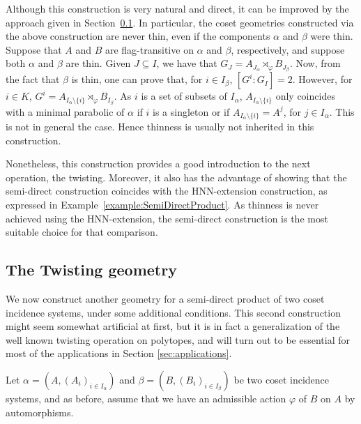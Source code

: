 \documentclass[11pt,letterpaper]{amsart}
\begin{document}
Although this construction is very natural and direct, it can be improved by the approach given in Section~\ref{subsec:twist_section}.
In particular, the coset geometries constructed via the above construction are never thin, even if the components $\alpha$ and $\beta$ were thin.
Suppose that $A$ and $B$ are flag-transitive on $\alpha$ and $\beta$, respectively, and suppose both $\alpha$ and $\beta$ are thin.
Given $J\subseteq I$, we have that $G_{J}=A_{J_\alpha}\rtimes_\varphi B_{J_\beta}$. 
Now, from the fact that $\beta$ is thin, one can prove that, for $i\in I_\beta$, $[G^i:G_I]=2$.
However, for $i\in K$, $G^{i} = A_{I_\alpha\setminus\{i\}}\rtimes_\varphi B_{I_\beta}$.
As $i$ is a set of subsets of $I_\alpha$, $A_{I_\alpha\setminus\{i\}}$ only coincides with a minimal parabolic of $\alpha$ if $i$ is a singleton or if $A_{I_\alpha\setminus\{i\}} = A^j$, for $j\in I_\alpha$. This is not in general the case.
Hence thinness is usually not inherited in this construction.

Nonetheless, this construction provides a good introduction to the next operation, the twisting. Moreover, it also has the advantage of showing that the semi-direct construction coincides with the HNN-extension construction, as expressed in Example~\ref{example:SemiDirectProduct}. As thinness is never achieved using the HNN-extension, the semi-direct construction is the most suitable choice for that comparison.


\subsection{The Twisting geometry}\label{subsec:twist_section}

We now construct another geometry for a semi-direct product of two coset incidence systems, under some additional conditions. This second construction might seem somewhat artificial at first, but it is in fact a generalization of the well known twisting operation on polytopes, and will turn out to be essential for most of the applications in Section \ref{sec:applications}.

Let $\alpha=(A,(A_i)_{i\in I_\alpha})$ and $\beta=(B,(B_i)_{i\in I_\beta})$ be two coset incidence systems, and as before, assume that we have an admissible action $\varphi$ of $B$ on $A$ by automorphisms.
\end{document}
